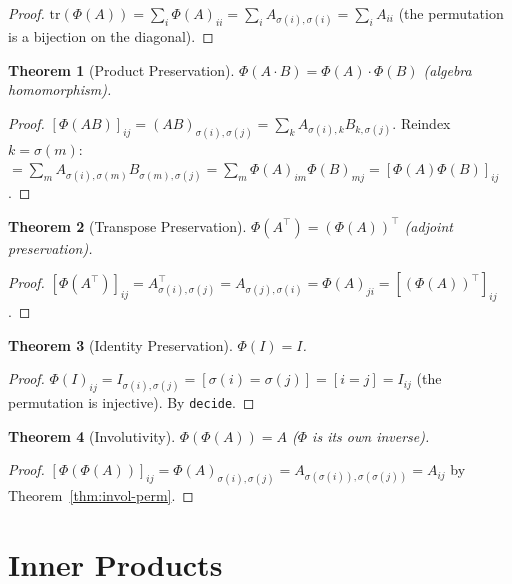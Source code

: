 \documentclass[12pt,a4paper]{article}
\newtheorem{theorem}{Theorem}[section]
\begin{document}
\begin{proof}
$\mathrm{tr}(\Phi(A)) = \sum_i \Phi(A)_{ii} = \sum_i A_{\sigma(i),\sigma(i)}
= \sum_i A_{ii}$ (the permutation is a bijection on the diagonal).
\end{proof}

\begin{theorem}[Product Preservation]\label{thm:product}
$\Phi(A \cdot B) = \Phi(A) \cdot \Phi(B)$ (algebra homomorphism).
\end{theorem}

\begin{proof}
$[\Phi(AB)]_{ij} = (AB)_{\sigma(i),\sigma(j)} = \sum_k A_{\sigma(i),k}
B_{k,\sigma(j)}$. Reindex $k = \sigma(m)$:
$= \sum_m A_{\sigma(i),\sigma(m)} B_{\sigma(m),\sigma(j)}
= \sum_m \Phi(A)_{im} \Phi(B)_{mj} = [\Phi(A)\Phi(B)]_{ij}$.
\end{proof}

\begin{theorem}[Transpose Preservation]\label{thm:transpose}
$\Phi(A^\top) = (\Phi(A))^\top$ (adjoint preservation).
\end{theorem}

\begin{proof}
$[\Phi(A^\top)]_{ij} = A^\top_{\sigma(i),\sigma(j)} = A_{\sigma(j),\sigma(i)}
= \Phi(A)_{ji} = [(\Phi(A))^\top]_{ij}$.
\end{proof}

\begin{theorem}[Identity Preservation]\label{thm:identity}
$\Phi(I) = I$.
\end{theorem}

\begin{proof}
$\Phi(I)_{ij} = I_{\sigma(i),\sigma(j)} = [\sigma(i) = \sigma(j)]
= [i = j] = I_{ij}$ (the permutation is injective).
By \texttt{decide}.
\end{proof}

\begin{theorem}[Involutivity]\label{thm:involutive}
$\Phi(\Phi(A)) = A$ ($\Phi$ is its own inverse).
\end{theorem}

\begin{proof}
$[\Phi(\Phi(A))]_{ij} = \Phi(A)_{\sigma(i),\sigma(j)}
= A_{\sigma(\sigma(i)),\sigma(\sigma(j))} = A_{ij}$
by Theorem~\ref{thm:invol-perm}.
\end{proof}

\section{Inner Products}
\end{document}
